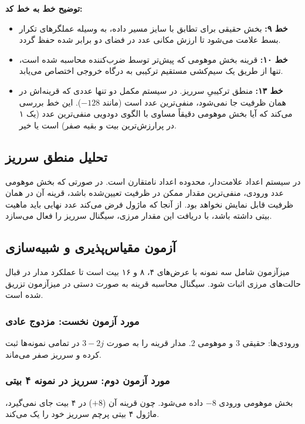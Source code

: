 \documentclass[11pt,a4paper]{article}
\begin{document}
\textbf{توضیح خط به خط کد:}
\begin{itemize}
    \item \textbf{خط ۹:} بخش حقیقی برای تطابق با سایز مسیر داده، به وسیله عملگرهای تکرار \lr{\{\}} بسط علامت می‌شود تا ارزش مکانی عدد در فضای دو برابر شده حفظ گردد.
    \item \textbf{خط ۱۰:} قرینه بخش موهومی که پیش‌تر توسط ضرب‌کننده محاسبه شده است، تنها از طریق یک سیم‌کشی مستقیم ترکیبی به درگاه خروجی اختصاص می‌یابد.
    \item \textbf{خط ۱۳:} منطق ترکیبیِ سرریز. در سیستم مکمل دو تنها عددی که قرینه‌اش در همان ظرفیت جا نمی‌شود، منفی‌ترین عدد است (مانند $-128$). این خط بررسی می‌کند که آیا بخش موهومی دقیقاً مساوی با الگوی دودویی منفی‌ترین عدد (یک ۱ در پرارزش‌ترین بیت و بقیه صفر) است یا خیر.
\end{itemize}

\subsection{تحلیل منطق سرریز}
در سیستم اعداد علامت‌دار، محدوده اعداد نامتقارن است. در صورتی که بخش موهومی عدد ورودی، منفی‌ترین مقدار ممکن در ظرفیت تعیین‌شده باشد، قرینه آن در همان ظرفیت قابل نمایش نخواهد بود. از آنجا که ماژول فرض می‌کند عدد نهایی باید ماهیت  بیتی داشته باشد، با دریافت این مقدار مرزی، سیگنال سرریز را فعال می‌سازد.

\subsection{آزمون مقیاس‌پذیری و شبیه‌سازی}
میزآزمون شامل سه نمونه با عرض‌های ۴، ۸ و ۱۶ بیت است تا عملکرد مدار در قبال حالت‌های مرزی اثبات شود. سیگنال محاسبه قرینه به صورت دستی در میزآزمون تزریق شده است.

\subsubsection{مورد آزمون نخست: مزدوج عادی}
ورودی‌ها: حقیقی $3$ و موهومی $2$. مدار قرینه را به صورت $3 - 2j$ در تمامی نمونه‌ها ثبت کرده و سرریز صفر می‌ماند.

\subsubsection{مورد آزمون دوم: سرریز در نمونه ۴ بیتی}
بخش موهومی ورودی $-8$ داده می‌شود. چون قرینه آن ($+8$) در ۴ بیت جای نمی‌گیرد، ماژول ۴ بیتی پرچم سرریز خود را یک می‌کند.
\end{document}
